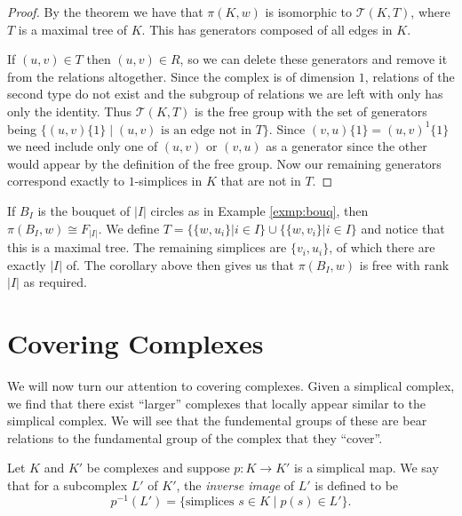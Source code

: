 \begin{proof}
  By the theorem we have that $\pi(K,w)$ is isomorphic to $\mathcal{T}(K,T)$, where $T$ is a maximal tree of $K$. This has generators composed of all edges in $K$.

  If $(u,v) \in T$ then $(u,v) \in R$, so we can delete these generators and remove it from the relations altogether. Since the complex is of dimension $1$, relations of the second type do not exist and the subgroup of relations we are left with only has only the identity. Thus $\mathcal{T}(K,T)$ is the free group with the set of generators being $\{(u,v) \{1\} \mid (u,v) \text{ is an edge not in } T\}$. Since $(v,u) \{1\} = (u,v)^{1} \{ 1 \}$ we need include only one of $(u,v)$ or $(v,u)$ as a generator since the other would appear by the definition of the free group. Now our remaining generators correspond exactly to $1$-simplices in $K$ that are not in $T$.
\end{proof}


\begin{example}
  \label{exmp:bouq-fund}
  If $B_I$ is the bouquet of $|I|$ circles as in Example \ref{exmp:bouq}, then $\pi(B_I,w) \cong F_{|I|}$. We define $T = \{ \{w,u_i \} | i \in I \} \cup \{ \{w,v_i \} | i \in I \}$ and notice that this is a maximal tree. The remaining simplices are $\{v_i,u_i\}$, of which there are exactly $|I|$ of. The corollary above then gives us that $\pi(B_I,w)$ is free with rank $|I|$ as required.
\end{example}

\section{Covering Complexes}
We will now turn our attention to covering complexes. Given a simplical complex, we find that there exist ``larger'' complexes that locally appear similar to the simplical complex. We will see that the fundemental groups of these are bear relations to the fundamental group of the complex that they ``cover''.

\begin{definition}
  Let $K$ and $K'$ be complexes and suppose $p: K \rightarrow K'$ is a simplical map. We say that for a subcomplex $L'$ of $K'$, the \emph{inverse image} of $L'$ is defined to be
  \begin{equation*}
    p^{-1}(L') = \{ \text{simplices } s \in K \mid p(s) \in L' \}.
  \end{equation*}
\end{definition}

